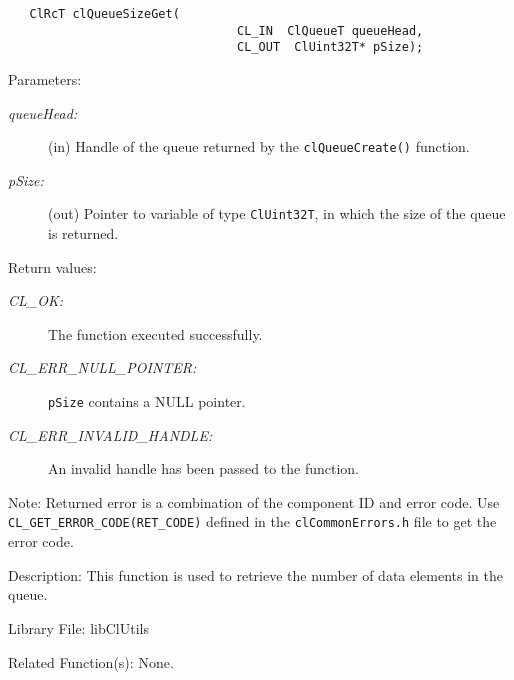 \begin{flushleft}
\begin{Desc}
\footnotesize\begin{verbatim}   ClRcT clQueueSizeGet(
                       			CL_IN  ClQueueT queueHead,
                       			CL_OUT  ClUint32T* pSize);
\end{verbatim}
\normalsize
\end{Desc}
\begin{Desc}
\item[Parameters:]
\begin{description}
\item[{\em queue\-Head:}](in) Handle of the queue returned by the {\tt{cl\-Queue\-Create()}} function. 
\item[{\em p\-Size:}](out) Pointer to variable of type {\tt{Cl\-Uint32T}}, in which the size of the queue is returned.\end{description}
\end{Desc}
\begin{Desc}
\item[Return values:]
\begin{description}
\item[{\em CL\_\-OK:}]The function executed successfully. 
\item[{\em CL\_\-ERR\_\-NULL\_\-POINTER:}]{\tt{pSize}} contains a NULL pointer. 
\item[{\em CL\_\-ERR\_\-INVALID\_\-HANDLE:}]An invalid handle has been passed to the function.
\end{description}
\end{Desc}
\begin{Desc}
\item[Note:]Returned error is a combination of the component ID and error code. Use {\tt {CL\_\-GET\_\-ERROR\_\-CODE(RET\_\-CODE)}} defined in the
{\tt{clCommonErrors.h}} file to get the error code.\end{Desc}
\begin{Desc}
\item[Description:]This function is used to retrieve the number of data elements in the queue.\end{Desc}
\begin{Desc}
\item[Library File:]lib\-Cl\-Utils\end{Desc}
\begin{Desc}
\item[Related Function(s):]None. \end{Desc}
\newpage



\end{flushleft}
